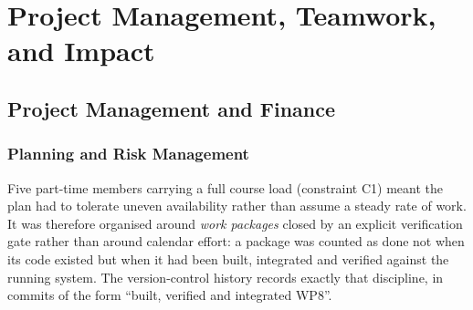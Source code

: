 \chapter{Project Management, Teamwork, and Impact}
\label{ch:management}

\section{Project Management and Finance}

\subsection{Planning and Risk Management}
\label{sec:plan}

Five part-time members carrying a full course load (constraint C1) meant the
plan had to tolerate uneven availability rather than assume a steady rate of
work. It was therefore organised around \emph{work packages} closed by an
explicit verification gate rather than around calendar effort: a package was
counted as done not when its code existed but when it had been built,
integrated and verified against the running system. The version-control
history records exactly that discipline, in commits of the form ``built,
verified and integrated WP8''.

